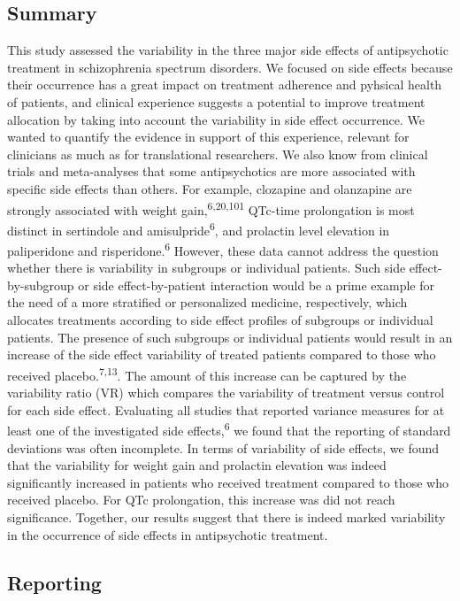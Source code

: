 \documentclass[9pt,english,,jou,floatsintext]{apa6}
\begin{document}
\subsection{Summary}\label{summary}

This study assessed the variability in the three major side effects of
antipsychotic treatment in schizophrenia spectrum disorders. We focused
on side effects because their occurrence has a great impact on treatment
adherence and pyhsical health of patients, and clinical experience
suggests a potential to improve treatment allocation by taking into
account the variability in side effect occurrence. We wanted to quantify
the evidence in support of this experience, relevant for clinicians as
much as for translational researchers. We also know from clinical trials
and meta-analyses that some antipsychotics are more associated with
specific side effects than others. For example, clozapine and olanzapine
are strongly associated with weight gain,\textsuperscript{6,20,101}
QTc-time prolongation is most distinct in sertindole and
amisulpride\textsuperscript{6}, and prolactin level elevation in
paliperidone and risperidone.\textsuperscript{6} However, these data
cannot address the question whether there is variability in subgroups or
individual patients. Such side effect-by-subgroup or side
effect-by-patient interaction would be a prime example for the need of a
more stratified or personalized medicine, respectively, which allocates
treatments according to side effect profiles of subgroups or individual
patients. The presence of such subgroups or individual patients would
result in an increase of the side effect variability of treated patients
compared to those who received placebo.\textsuperscript{7,13}. The
amount of this increase can be captured by the variability ratio (VR)
which compares the variability of treatment versus control for each side
effect. Evaluating all studies that reported variance measures for at
least one of the investigated side effects,\textsuperscript{6} we found
that the reporting of standard deviations was often incomplete. In terms
of variability of side effects, we found that the variability for weight
gain and prolactin elevation was indeed significantly increased in
patients who received treatment compared to those who received placebo.
For QTc prolongation, this increase was did not reach significance.
Together, our results suggest that there is indeed marked variability in
the occurrence of side effects in antipsychotic treatment.

\subsection{Reporting}\label{reporting}
\end{document}
